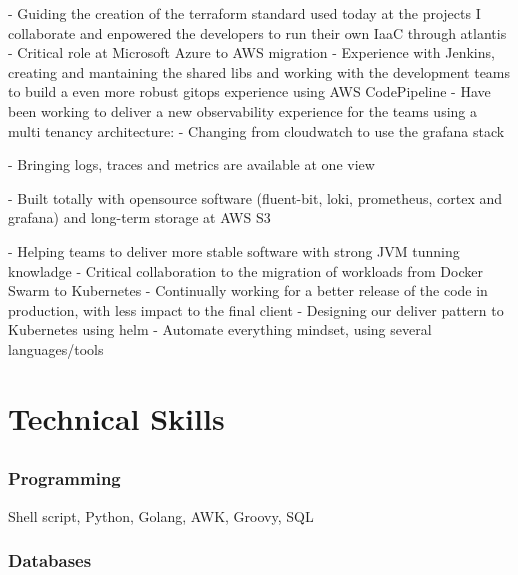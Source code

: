 \documentclass{article}
\begin{document}
- Guiding the creation of the terraform standard used today at the projects I collaborate and enpowered the developers to run their own IaaC through atlantis \newline
- Critical role at Microsoft Azure to AWS migration \newline
- Experience with Jenkins, creating and mantaining the shared libs and working with the development teams to build a even more robust gitops experience using AWS CodePipeline \newline
- Have been working to deliver a new observability experience for the teams using a multi tenancy architecture: \newline
    - Changing from cloudwatch to use the grafana stack \par
    - Bringing logs, traces and metrics are available at one view \par
    - Built totally with opensource software (fluent-bit, loki, prometheus, cortex and grafana) and long-term storage at AWS S3\par
- Helping teams to deliver more stable software with strong JVM tunning knowladge \newline
- Critical collaboration to the migration of workloads from Docker Swarm to Kubernetes \newline
- Continually working for a better release of the code in production, with less impact to the final client \newline
- Designing our deliver pattern to Kubernetes using helm  \newline
- Automate everything mindset, using several languages/tools \newline

\section{Technical Skills}

\subsection{}

\subsubsection{Programming}

Shell script, Python, Golang, AWK, Groovy, SQL

\subsubsection{Databases}
\end{document}
